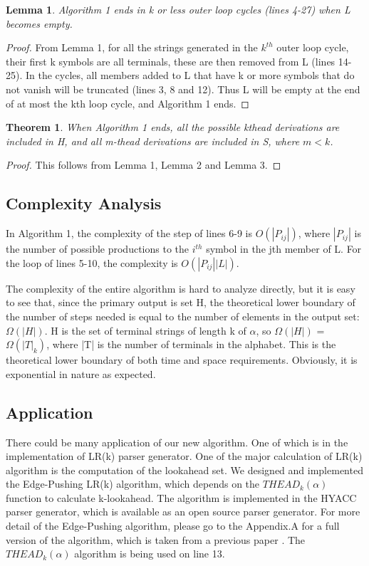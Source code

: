 \documentclass{sig-alternate-05-2015}
\newtheorem{theorem}{Theorem}
\newtheorem{lemma}{Lemma}
\begin{document}
\begin{lemma}
Algorithm 1 ends in k or less outer loop cycles
(lines 4-27) when L becomes empty.
\end{lemma}
\begin{proof}
From Lemma 1, for all the strings generated in
the $k^{th}$ outer loop cycle, their first k symbols are all terminals,
these are then removed from L (lines 14-25). In the
cycles, all members added to L that have k or more symbols
that do not vanish will be truncated (lines 3, 8 and 12).
Thus L will be empty at the end of at most the kth loop
cycle, and Algorithm 1 ends.
\end{proof}

\begin{theorem}
When Algorithm 1 ends, all the possible kthead
derivations are included in H, and all m-thead derivations
are included in S, where $m < k$.
\end{theorem}
\begin{proof}
This follows from Lemma 1, Lemma 2 and
Lemma 3.
\end{proof}


\subsection{Complexity Analysis}
In Algorithm 1, the complexity of the step of lines 6-9 is
$O(|P_{ij}|)$, where $|P_{ij}|$ is the number of possible productions to
the $i^{th}$ symbol in the jth member of L. For the loop of lines
5-10, the complexity is $O(|P_{ij}||L|)$.

The complexity of the entire algorithm is hard to analyze
directly, but it is easy to see that, since the primary output
is set H, the theoretical lower boundary of the number of
steps needed is equal to the number of elements in the output
set: $\Omega(|H|)$. H is the set of terminal strings of length k of
$\alpha$, so $\Omega(|H|)$ = $\Omega(|T|_k)$, where |T| is the number of terminals
in the alphabet. This is the theoretical lower boundary of
both time and space requirements. Obviously, it is exponential
in nature as expected.

\subsection{Application}
There could be many application of our new algorithm. One of which is in the implementation of LR(k) parser generator.
One of the major calculation of LR(k) algorithm is the computation of the lookahead set.
We designed and implemented the Edge-Pushing LR(k)
algorithm, which depends on the $THEAD_k(\alpha)$ function to
calculate k-lookahead. The algorithm is implemented in the
HYACC parser generator, which is available as an open
source parser generator\cite{chen11full,chen08hyacc}. For more detail of the Edge-Pushing algorithm, please go to the Appendix.A for a full version
of the algorithm, which is taken from a previous
paper \cite{chen11edge}. The $THEAD_k(\alpha)$ algorithm is being used on line 13.
\end{document}

